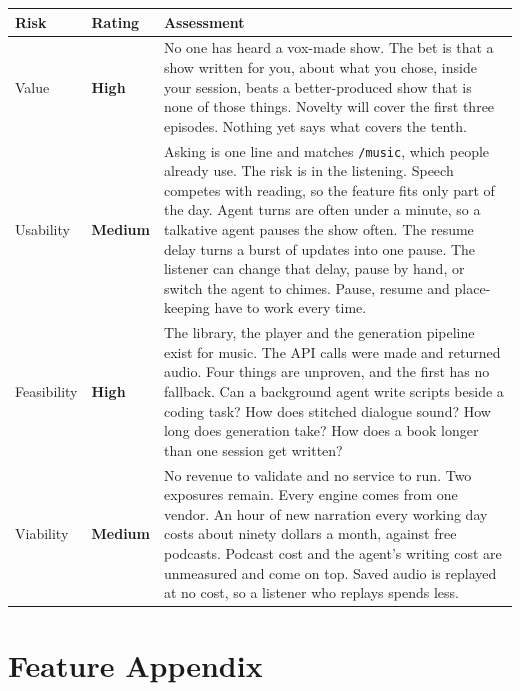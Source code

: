 \documentclass[11pt,letterpaper]{article} %
\begin{document}
\renewcommand{\arraystretch}{1.6} %
\begin{tabularx}{\textwidth}{@{} l l X @{}}
\toprule
\textbf{\color{SectionBlue}Risk} & \textbf{\color{SectionBlue}Rating} & \textbf{\color{SectionBlue}Assessment} \\
\midrule
Value      & \textcolor{RiskRed}{\textbf{High}} &
  No one has heard a vox-made show. The bet is that a show written for you,
  about what you chose, inside your session, beats a better-produced show
  that is none of those things. Novelty will cover the first three
  episodes. Nothing yet says what covers the tenth. \\
Usability  & \textcolor{RiskAmber}{\textbf{Medium}} &
  Asking is one line and matches \texttt{/music}, which people already use.
  The risk is in the listening. Speech competes with reading, so the
  feature fits only part of the day. Agent turns are often under a minute,
  so a talkative agent pauses the show often. The resume delay turns a
  burst of updates into one pause. The listener can change that delay,
  pause by hand, or switch the agent to chimes. Pause, resume and
  place-keeping have to work every time. \\
Feasibility & \textcolor{RiskRed}{\textbf{High}} &
  The library, the player and the generation pipeline exist for music. The
  API calls were made and returned audio. Four things are unproven, and the
  first has no fallback. Can a
  background agent write scripts beside a coding task? How does stitched
  dialogue sound? How long does generation take? How does a book longer
  than one session get written? \\
Viability  & \textcolor{RiskAmber}{\textbf{Medium}} &
  No revenue to validate and no service to run. Two exposures remain. Every
  engine comes from one vendor. An hour of new narration every working day
  costs about ninety dollars a month, against free podcasts. Podcast cost
  and the agent's writing cost are unmeasured and come on top. Saved audio
  is replayed at no cost, so a listener who replays spends less. \\
\bottomrule
\end{tabularx}
\renewcommand{\arraystretch}{1.0}


\newpage
\section*{Feature Appendix}
\end{document}
